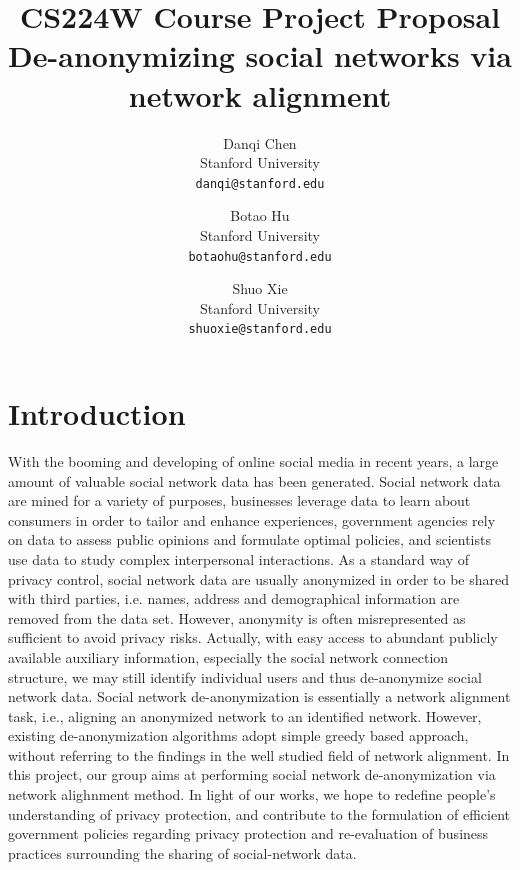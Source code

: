 \documentclass[11pt,letterpaper]{article}
\begin{document}
\title{{CS224W Course Project Proposal \\} \bf De-anonymizing social networks via network alignment}

\author{Danqi Chen\\
Stanford University\\
{\tt\small danqi@stanford.edu}
\and
Botao Hu\\
Stanford University\\
{\tt\small botaohu@stanford.edu}
%
\and
Shuo Xie\\
Stanford University\\
{\tt\small shuoxie@stanford.edu}
}

\maketitle
\thispagestyle{empty}

\maketitle

\section{Introduction}


With the booming and developing of online social media in recent years, a large amount of valuable social network data has been generated. Social network data are mined for a variety of purposes, businesses leverage data to learn about consumers in order to tailor and enhance experiences, government agencies rely on data to assess public opinions and formulate optimal policies, and scientists use data to study complex interpersonal interactions. 
As a standard way of privacy control, social network data are usually anonymized in order to be shared with third parties, i.e. names, address and demographical information are removed from the data set. However, anonymity is often misrepresented as sufficient to avoid privacy risks. Actually, with easy access to abundant publicly available auxiliary information, especially the social network connection structure, we may still identify individual users and thus de-anonymize social network data.
Social network de-anonymization is essentially a network alignment task, i.e., aligning an anonymized network to an identified network. However, existing de-anonymization algorithms \cite{Narayanan2009} adopt simple greedy based approach, without referring to the findings in the well studied field of network alignment. In this project, our group aims at performing social network de-anonymization via network alighnment method. In light of our works, we hope to redefine people's understanding of privacy protection, and contribute to the formulation of efficient government policies regarding privacy protection and re-evaluation of business practices surrounding the sharing of social-network data.
\end{document}
